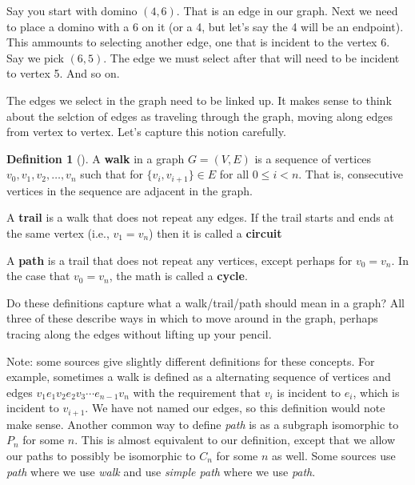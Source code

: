 \documentclass[10pt,]{book}
\newcommand{\terminology}[1]{\textbf{#1}}
\theoremstyle{plain}
\theoremstyle{definition}
\newtheorem{definition}[theorem]{Definition}
\theoremstyle{definition}
\theoremstyle{definition}
\numberwithin{equation}{chapter}
\newcommand{\lt}{<}
\begin{document}
\par
\hypertarget{p-127}{}%
Say you start with domino \((4,6)\).  That is an edge in our graph.  Next we need to place a domino with a 6 on it (or a 4, but let's say the 4 will be an endpoint).  This ammounts to selecting another edge, one that is incident to the vertex 6.  Say we pick \((6,5)\).  The edge we must select after that will need to be incident to vertex 5.  And so on.%
\par
\hypertarget{p-128}{}%
The edges we select in the graph need to be linked up.  It makes sense to think about the selction of edges as traveling through the graph, moving along edges from vertex to vertex.  Let's capture this notion carefully.%
\begin{definition}[{}]\label{def-walk}
\hypertarget{p-129}{}%
A \terminology{walk} in a graph \(G = (V,E)\) is a sequence of vertices \(v_0, v_1, v_2, \ldots, v_n\) such that for \(\{v_i, v_{i+1}\} \in E\) for all \(0 \le i \lt n\).  That is, consecutive vertices in the sequence are adjacent in the graph.%
\par
\hypertarget{p-130}{}%
A \terminology{trail} is a walk that does not repeat any edges.  If the trail starts and ends at the same vertex (i.e., \(v_1 = v_n\)) then it is called a \terminology{circuit}%
\par
\hypertarget{p-131}{}%
A \terminology{path} is a trail that does not repeat any vertices, except perhaps for \(v_0 = v_n\).  In the case that \(v_0 = v_n\), the math is called a \terminology{cycle}.%
\end{definition}
\hypertarget{p-132}{}%
Do these definitions capture what a walk/trail/path should mean in a graph?  All three of these describe ways in which to move around in the graph, perhaps tracing along the edges without lifting up your pencil.%
\par
\hypertarget{p-133}{}%
Note: some sources give slightly different definitions for these concepts.  For example, sometimes a walk is defined as a alternating sequence of vertices and edges \(v_1e_1v_2e_2v_3\cdots e_{n-1}v_n\) with the requirement that \(v_i\) is incident to \(e_i\), which is incident to \(v_{i+1}\).  We have not named our edges, so this definition would note make sense.  Another common way to define \emph{path} is as a subgraph isomorphic to \(P_n\) for some \(n\).  This is almost equivalent to our definition, except that we allow our paths to possibly be isomorphic to \(C_n\) for some \(n\) as well.  Some sources use \emph{path} where we use \emph{walk} and use \emph{simple path} where we use \emph{path}.%
\end{document}
